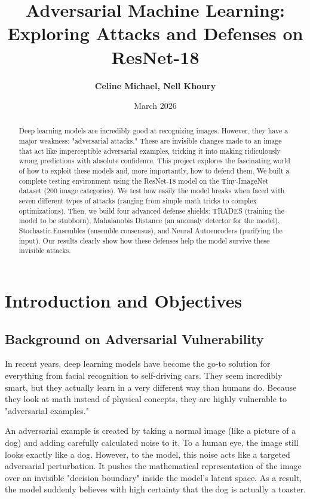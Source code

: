\documentclass[12pt, a4paper]{article}
\title{\textbf{Adversarial Machine Learning: Exploring Attacks and Defenses on ResNet-18}}
\author{\textbf{Celine Michael, Nell Khoury}}
\date{March 2026}
\begin{document}
\maketitle
\newpage
\tableofcontents
\newpage

\begin{abstract}
Deep learning models are incredibly good at recognizing images. However, they have a major weakness: "adversarial attacks." These are invisible changes made to an image that act like imperceptible adversarial examples, tricking it into making ridiculously wrong predictions with absolute confidence. This project explores the fascinating world of how to exploit these models and, more importantly, how to defend them. We built a complete testing environment using the ResNet-18 model on the Tiny-ImageNet dataset (200 image categories). We test how easily the model breaks when faced with seven different types of attacks (ranging from simple math tricks to complex optimizations). Then, we build four advanced defense shields: TRADES (training the model to be stubborn), Mahalanobis Distance (an anomaly detector for the model), Stochastic Ensembles (ensemble consensus), and Neural Autoencoders (purifying the input). Our results clearly show how these defenses help the model survive these invisible attacks.
\end{abstract}

\newpage
\section{Introduction and Objectives}

\subsection{Background on Adversarial Vulnerability}
In recent years, deep learning models have become the go-to solution for everything from facial recognition to self-driving cars. They seem incredibly smart, but they actually learn in a very different way than humans do. Because they look at math instead of physical concepts, they are highly vulnerable to "adversarial examples."

An adversarial example is created by taking a normal image (like a picture of a dog) and adding carefully calculated noise to it. To a human eye, the image still looks exactly like a dog. However, to the model, this noise acts like a targeted adversarial perturbation. It pushes the mathematical representation of the image over an invisible "decision boundary" inside the model's latent space. As a result, the model suddenly believes with high certainty that the dog is actually a toaster.
\end{document}
